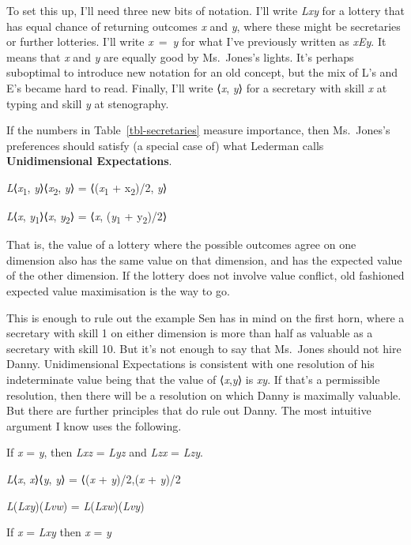 \documentclass[
  11pt,
  letterpaper,
  DIV=11,
  numbers=noendperiod,
  twoside]{scrartcl}
\providecommand{\tightlist}{%
  \setlength{\itemsep}{0pt}\setlength{\parskip}{0pt}}
\begin{document}
To set this up, I'll need three new bits of notation. I'll write
\emph{Lxy} for a lottery that has equal chance of returning outcomes
\emph{x} and \emph{y}, where these might be secretaries or further
lotteries. I'll write \emph{x}~=~\emph{y} for what I've previously
written as \emph{xEy}. It means that \emph{x} and \emph{y} are equally
good by Ms.~Jones's lights. It's perhaps suboptimal to introduce new
notation for an old concept, but the mix of L's and E's became hard to
read. Finally, I'll write ⟨\emph{x}, \emph{y}⟩ for a secretary with
skill \emph{x} at typing and skill \emph{y} at stenography.

If the numbers in Table~\ref{tbl-secretaries} measure importance, then
Ms.~Jones's preferences should satisfy (a special case of) what Lederman
calls \textbf{Unidimensional Expectations}.

\begin{description}
\tightlist
\item[Unidimensional Expectations (UE)]
\emph{L}⟨\emph{x}\textsubscript{1}, \emph{y}⟩⟨\emph{x}\textsubscript{2},
\emph{y}⟩ = ⟨(\emph{x}\textsubscript{1} + x\textsubscript{2})/2,
\emph{y}⟩

\emph{L}⟨\emph{x}, \emph{y}\textsubscript{1}⟩⟨\emph{x},
\emph{y}\textsubscript{2}⟩ = ⟨\emph{x}, (\emph{y}\textsubscript{1} +
y\textsubscript{2})/2⟩
\end{description}

That is, the value of a lottery where the possible outcomes agree on one
dimension also has the same value on that dimension, and has the
expected value of the other dimension. If the lottery does not involve
value conflict, old fashioned expected value maximisation is the way to
go.

This is enough to rule out the example Sen has in mind on the first
horn, where a secretary with skill 1 on either dimension is more than
half as valuable as a secretary with skill 10. But it's not enough to
say that Ms.~Jones should not hire Danny. Unidimensional Expectations is
consistent with one resolution of his indeterminate value being that the
value of ⟨\emph{x},\emph{y}⟩ is \emph{xy}. If that's a permissible
resolution, then there will be a resolution on which Danny is maximally
valuable. But there are further principles that do rule out Danny. The
most intuitive argument I know uses the following.

\begin{description}
\tightlist
\item[Substitution of Identicals (SI)]
If \emph{x} = \emph{y}, then \emph{Lxz} = \emph{Lyz} and \emph{Lzx} =
\emph{Lzy}.
\item[No Trade-Off (NT)]
\emph{L}⟨\emph{x}, \emph{x}⟩⟨\emph{y}, \emph{y}⟩ = ⟨(\emph{x} +
\emph{y})/2,(\emph{x} + \emph{y})/2
\item[Rearrangement of Outcomes (RO)]
\emph{L}(\emph{Lxy})(\emph{Lvw}) = \emph{L}(\emph{Lxw})(\emph{Lvy})
\item[Weak Independence (WI)]
If \emph{x} = \emph{Lxy} then \emph{x} = \emph{y}
\end{description}
\end{document}
